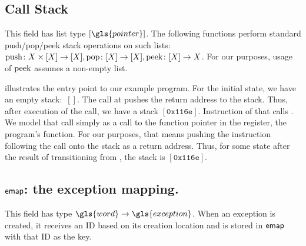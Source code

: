 \subsection{Call Stack}
This field has list type $[\gls{pointer}]$.
The following functions perform standard push/pop/peek stack operations on such lists:
\(
\operatorname{push}\colon X\times[X]\to[X],
\operatorname{pop}\colon[X]\to[X],
\operatorname{peek}\colon[X]\to X
\).
For our purposes, usage of $\operatorname{peek}$ assumes a non-empty list. %
\begin{example}
   illustrates the entry point to our example program.
  For the initial state, we have an empty stack:~$[]$.
  The call at  pushes the return address to the stack.
  Thus, after execution of the call, we have a stack $[\mathtt{0x116e}]$.
  Instruction  of that  calls .
  We model that call simply as a call to the function pointer in the  register, the program's  function.
  For our purposes, that means pushing the instruction following the call onto the stack as a return address.
  Thus, for some state after the result of transitioning from , the stack is $[\mathtt{0x116e}]$.
\end{example}

\subsection{$\operatorname{\mathsf{emap}}$: the exception mapping.}
This field has type $\gls{word}\to\gls{exception}$.
When an exception is created, it receives an ID based on its creation location and is stored in $\operatorname{\mathsf{emap}}$ with that ID as the key.


